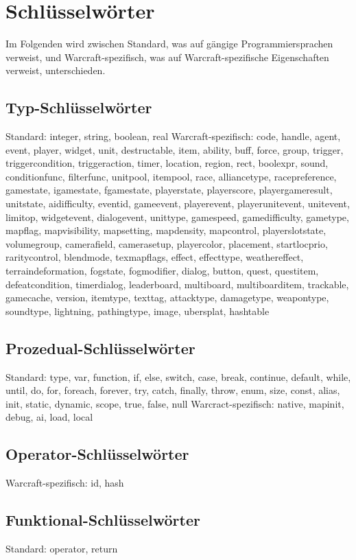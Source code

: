 \chapter{Schlüsselwörter}
Im Folgenden wird zwischen Standard, was auf gängige Programmiersprachen verweist, und Warcraft-spezifisch, was auf Warcraft-spezifische
Eigenschaften verweist, unterschieden.

\section{Typ-Schlüsselwörter}
Standard: integer, string, boolean, real
Warcraft-spezifisch: code, handle, agent, event, player, widget, unit, destructable, item, ability, buff, force, group, trigger, triggercondition, triggeraction, timer, location, region, rect, boolexpr, sound, conditionfunc, filterfunc, unitpool, itempool, race, alliancetype, racepreference, gamestate, igamestate, fgamestate, playerstate, playerscore, playergameresult, unitstate, aidifficulty, eventid, gameevent, playerevent, playerunitevent, unitevent, limitop, widgetevent, dialogevent, unittype, gamespeed, gamedifficulty, gametype, mapflag, mapvisibility, mapsetting, mapdensity, mapcontrol, playerslotstate, volumegroup, camerafield, camerasetup, playercolor, placement, startlocprio, raritycontrol, blendmode, texmapflags, effect, effecttype, weathereffect, terraindeformation, fogstate, fogmodifier, dialog, button, quest, questitem, defeatcondition, timerdialog, leaderboard, multiboard, multiboarditem, trackable, gamecache, version, itemtype, texttag, attacktype, damagetype, weapontype, soundtype, lightning, pathingtype, image, ubersplat, hashtable

\section{Prozedual-Schlüsselwörter}
Standard: type, var, function, if, else, switch, case, break, continue, default, while, until, do, for, foreach, forever, try, catch, finally, throw, enum, size, const, alias, init, static, dynamic, scope, true, false, null
Warcract-spezifisch: native, mapinit, debug, ai, load, local

\section{Operator-Schlüsselwörter}
Warcraft-spezifisch: id, hash

\section{Funktional-Schlüsselwörter}
Standard: operator, return

